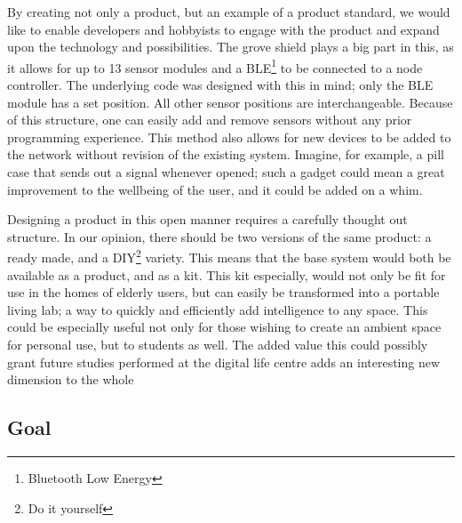 \documentclass{below-ext}
\begin{document}
By creating not only a product, but an example of a product standard, we would like to enable developers and hobbyists to engage with the product and expand upon the technology and possibilities. The grove shield plays a big part in this, as it allows for up to 13 sensor modules and a BLE\footnote{Bluetooth Low Energy} to be connected to a node controller. The underlying code was designed with this in mind; only the BLE module has a set position. All other sensor positions are interchangeable. Because of this structure, one can easily add and remove sensors without any prior programming experience. This method also allows for new devices to be added to the network without revision of the existing system. Imagine, for example, a pill case that sends out a signal whenever opened; such a gadget could mean a great improvement to the wellbeing of the user, and it could be added on a whim. 

Designing a product in this open manner requires a carefully thought out structure. In our opinion, there should be two versions of the same product: a ready made, and a DIY\footnote{Do it yourself} variety. This means that the base system would both be available as a product, and as a kit. This kit especially, would not only be fit for use in the homes of elderly users, but can easily be transformed into a portable living lab; a way to quickly and efficiently add intelligence to any space. This could be especially useful not only for those wishing to create an ambient space for personal use, but to students as well. The added value this could possibly grant future studies performed at the digital life centre adds an interesting new dimension to the whole


\subsection{Goal}
\end{document}
